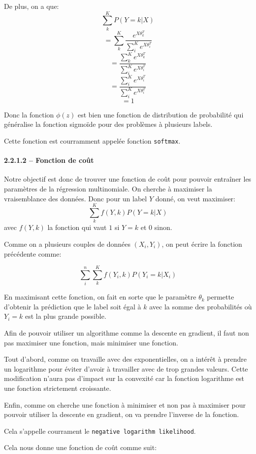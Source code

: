 \documentclass[
]{article}
\begin{document}
De plus, on a que: \[\sum_k^K P(Y = k | X)\]
\[=\sum_k^K \frac{e^{X \theta_k^T}}{\sum_i^K e^{X \theta_i^T}}\]
\[=\frac{\sum_k^Ke^{X \theta_k^T}}{\sum_i^K e^{X \theta_i^T}}\]
\[=\frac{\sum_i^Ke^{X \theta_i^T}}{\sum_i^K e^{X \theta_i^T}}\] \[=1\]

Donc la fonction \(\phi(z)\) est bien une fonction de distribution de
probabilité qui généralise la fonction sigmoïde pour des problèmes à
plusieurs labels.

Cette fonction est courramment appelée fonction \texttt{softmax}.

\paragraph{2.2.1.2 -- Fonction de coût}\label{fonction-de-couxfbt}

Notre objectif est donc de trouver une fonction de coût pour pouvoir
entraîner les paramètres de la régression multinomiale. On cherche à
maximiser la vraisemblance des données. Donc pour un label \(Y\) donné,
on veut maximiser: \[\sum_k^K f(Y, k) P(Y = k | X)\] avec \(f(Y, k)\) la
fonction qui vaut \(1\) si \(Y = k\) et \(0\) sinon.

Comme on a plusieurs couples de données \((X_i, Y_i)\), on peut écrire
la fonction précédente comme:

\[\sum_i^n\sum_k^K f(Y_i, k) P(Y_i = k | X_i)\]

En maximisant cette fonction, on fait en sorte que le paramètre
\(\theta_k\) permette d'obtenir la prédiction que le label soit égal à
\(k\) avec la somme des probabilités où \(Y_i = k\) est la plus grande
possible.

Afin de pouvoir utiliser un algorithme comme la descente en gradient, il
faut non pas maximiser une fonction, mais minimiser une fonction.

Tout d'abord, comme on travaille avec des exponentielles, on a intérêt à
prendre un logarithme pour éviter d'avoir à travailler avec de trop
grandes valeurs. Cette modification n'aura pas d'impact sur la convexité
car la fonction logarithme est une fonction strictement croissante.

Enfin, comme on cherche une fonction à minimiser et non pas à maximiser
pour pouvoir utiliser la descente en gradient, on va prendre l'inverse
de la fonction.

Cela s'appelle courrament le \texttt{negative\ logarithm\ likelihood}.

Cela nous donne une fonction de coût comme suit:
\end{document}
